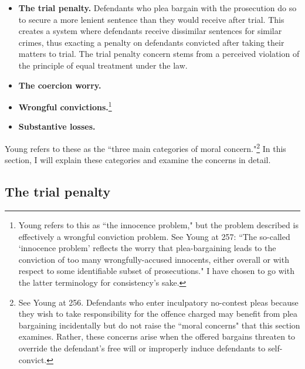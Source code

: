 \begin{itemize}
    \item \textbf{The trial penalty.} Defendants who plea bargain with the prosecution do so to secure a more lenient sentence than they would receive after trial. This creates a system where defendants receive dissimilar sentences for similar crimes, thus exacting a penalty on defendants convicted after taking their matters to trial. The trial penalty concern stems from a perceived violation of the principle of equal treatment under the law.
    \item \textbf{The coercion worry.} 
    \item \textbf{Wrongful convictions.}\footnote{Young refers to this as ``the innocence problem," but the problem described is effectively a wrongful conviction problem. See Young at 257: ``The so-called `innocence problem' reflects the worry that plea-bargaining leads to the conviction of too many wrongfully-accused innocents, either overall or with respect to some identifiable subset of prosecutions."  I have chosen to go with the latter terminology for consistency's sake.} 
    \item \textbf{Substantive losses.} 
\end{itemize}

Young refers to these as the ``three main categories of moral concern."\footnote{See Young at 256. Defendants who enter inculpatory no-contest pleas because they wish to take responsibility for the offence charged may benefit from plea bargaining incidentally but do not raise the ``moral concerns" that this section examines. Rather, these concerns arise when the offered bargains threaten to override the defendant's free will or improperly induce defendants to self-convict.} In this section, I will explain these categories and examine the concerns in detail. 

\subsection{The trial penalty}

